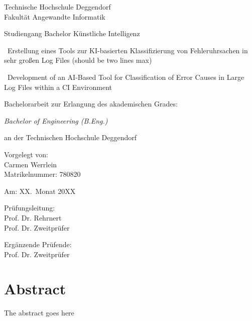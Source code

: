 \documentclass[12pt]{article}
\newcommand{\student}{Carmen Werrlein}
\newcommand{\matrnr}{780820}
\newcommand{\submissiondate}{XX.\ Monat 20XX}
\newcommand{\supervisor}{Prof. Dr. Rehrnert}
\newcommand{\secsupervisor}{Prof. Dr. Zweitprüfer} %
\newcommand{\faculty}{Angewandte Informatik}
\newcommand{\studies}{Bachelor Künstliche Intelligenz}
\newcommand{\degree}{Bachelor of Engineering (B.Eng.)}
\begin{document}
\pagestyle{headings}

\begin{titlepage}
\begin{center}
	{\usekomafont
	Technische Hochschule Deggendorf\\
	Fakultät \faculty\par}
	\vspace{.2cm}
{\Large Studiengang \studies\\}
\vspace{6\baselineskip}
{\Huge\usekomafont\ Erstellung eines Tools zur KI-basierten Klassifizierung von Fehleruhrsachen in sehr großen Log Files (should be two lines max)\par}
\vspace{1cm}
{\Huge\usekomafont\ Development of an AI-Based Tool for  Classification of Error Causes in Large Log Files within a CI Environment
\par}
\vspace{6\baselineskip}

\usekomafont
Bachelorarbeit zur Erlangung des akademischen Grades:

	\vspace{.2cm}
	\emph{\degree}
	\vspace{.2cm}

an der Technischen Hochschule Deggendorf\\
\end{center}
\vfill
\parbox[t]{.4\textwidth}{\usekomafont
	Vorgelegt von:\\
	\student\\
	Matrikelnummer: \matrnr\par
	\vspace{\baselineskip}
	Am: \submissiondate\par
}
\hfill
\parbox[t]{.4\textwidth}{\usekomafont
Prüfungsleitung:\\
\supervisor \\
\secsupervisor

\vspace{\baselineskip}
Ergänzende Prüfende:\\
\secsupervisor%
}
\end{titlepage}
\cleardoublepage\par


\chapter*{Abstract}
The abstract goes here
\end{document}
